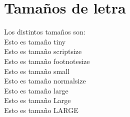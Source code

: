 \documentclass[10pt,a4paper]{article}
\begin{document}
\section{Tamaños de letra}
Los distintos tamaños son: \\
{\tiny Esto es tamaño tiny} \\
{\scriptsize Esto es tamaño scriptsize} \\
{\footnotesize Esto es tamaño footnotesize} \\
{\small Esto es tamaño small} \\
{\normalsize Esto es tamaño normalsize} \\
{\large Esto es tamaño large} \\
{\Large Esto es tamaño Large} \\
{\LARGE Esto es tamaño LARGE} \\
\end{document}
